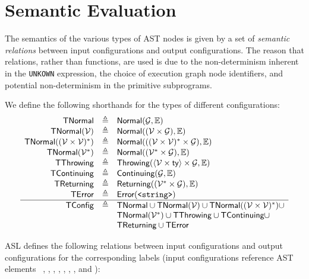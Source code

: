\documentclass{book}
\newcommand\XGraphs[0]{\mathcal{G}}
\newcommand\vals[0]{\mathcal{V}}
\newcommand\Normal[0]{\textsf{Normal}}
\newcommand\Throwing[0]{\textsf{Throwing}}
\newcommand\Continuing[0]{\textsf{Continuing}}
\newcommand\Returning[0]{\textsf{Returning}}
\newcommand\Error[0]{\textsf{Error}}
\begin{document}
\section{Semantic Evaluation}

The semantics of the various types of AST nodes is given by a set of \emph{semantic relations} between
input configurations and output configurations.
The reason that relations, rather than functions, are used is due to the
non-determinism inherent in the \texttt{UNKOWN} expression,
the choice of execution graph node identifiers,
and potential non-determinism in the primitive subprograms.

\newcommand\TError[0]{\textsf{TError}}
\newcommand\TNormal[0]{\textsf{TNormal}}
\newcommand\TThrowing[0]{\textsf{TThrowing}}
\newcommand\TContinuing[0]{\textsf{TContinuing}}
\newcommand\TReturning[0]{\textsf{TReturning}}
\newcommand\TConfig[0]{\textsf{TConfig}}
We define the following shorthands for the types of different configurations:
\[
  \begin{array}{rcl}
    \TNormal        &\triangleq& \Normal(\XGraphs, \envs)\\
    \TNormal(\vals)   &\triangleq& \Normal((\vals \times \XGraphs), \envs)\\
    \TNormal((\vals \times \vals)^*)   &\triangleq& \Normal(((\vals \times \vals)^* \times \XGraphs), \envs)\\
    \TNormal(\vals^*) &\triangleq& \Normal((\vals^* \times \XGraphs), \envs)\\
    \TThrowing        &\triangleq& \Throwing(\langle\vals \times \ty\rangle \times \XGraphs, \envs)\\
    \TContinuing      &\triangleq& \Continuing(\XGraphs, \envs)\\
    \TReturning       &\triangleq& \Returning((\vals^* \times \XGraphs), \envs)\\
    \TError           &\triangleq& \Error(\texttt{<string>})\\
    \hline
    \TConfig          &\triangleq& \TNormal \cup \TNormal(\vals) \cup \TNormal((\vals \times \vals)^*) \cup \\
    & & \TNormal(\vals^*) \cup \TThrowing \cup \TContinuing \cup \\
    & & \TReturning \cup \TError
  \end{array}
\]

ASL defines the following relations between input configurations and output configurations
for the corresponding labels (input configurations reference AST elements~\cite{ASLAbstractSyntaxReference}
\expr, \lexpr, \stmt, \slice, \localdeclitem, \identifier, \fordirection, and \catcher):
\end{document}
